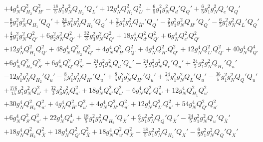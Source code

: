 {\begin{align}
 &+4 g_{N}^{4} Q_{H_2}^{2} Q_{H'}^{2} -\frac{18}{5} g_{1}^{2} g_{N}^{2} Q_{H_2}' Q_L' +12 g_{N}^{4} Q_{H_2}^{2} Q_{L'}^{2} +\frac{6}{5} g_{1}^{2} g_{N}^{2} Q_d' Q_Q' +\frac{6}{5} g_{1}^{2} g_{N}^{2} Q_e' Q_Q' \nonumber \\ 
 &-\frac{6}{5} g_{1}^{2} g_{N}^{2} Q_{H_1}' Q_Q' +\frac{24}{5} g_{1}^{2} g_{N}^{2} Q_{H_2}' Q_Q' +\frac{2}{5} g_{1}^{2} g_{N}^{2} Q_{\bar{H}'}' Q_Q' -\frac{2}{5} g_{1}^{2} g_{N}^{2} Q_{H'}' Q_Q' -\frac{6}{5} g_{1}^{2} g_{N}^{2} Q_L' Q_Q' \nonumber \\ 
 &+\frac{4}{3} g_{1}^{2} g_{N}^{2} Q_{Q'}^{2} +6 g_{2}^{2} g_{N}^{2} Q_{Q'}^{2} +\frac{32}{3} g_{3}^{2} g_{N}^{2} Q_{Q'}^{2} +18 g_{N}^{4} Q_{d'}^{2} Q_{Q'}^{2} +6 g_{N}^{4} Q_{e'}^{2} Q_{Q'}^{2} \nonumber \\ 
 &+12 g_{N}^{4} Q_{H_1}^{2} Q_{Q'}^{2} +48 g_{N}^{4} Q_{H_2}^{2} Q_{Q'}^{2} +4 g_{N}^{4} Q_{\bar{H}'}^{2} Q_{Q'}^{2} +4 g_{N}^{4} Q_{H'}^{2} Q_{Q'}^{2} +12 g_{N}^{4} Q_{L'}^{2} Q_{Q'}^{2} +40 g_{N}^{4} Q_{Q'}^{4} \nonumber \\ 
 &+6 g_{N}^{4} Q_{H_2}^{2} Q_{S'}^{2} +6 g_{N}^{4} Q_{Q'}^{2} Q_{S'}^{2} -\frac{24}{5} g_{1}^{2} g_{N}^{2} Q_d' Q_u' -\frac{24}{5} g_{1}^{2} g_{N}^{2} Q_e' Q_u' +\frac{24}{5} g_{1}^{2} g_{N}^{2} Q_{H_1}' Q_u' \nonumber \\ 
 &-12 g_{1}^{2} g_{N}^{2} Q_{H_2}' Q_u' -\frac{8}{5} g_{1}^{2} g_{N}^{2} Q_{\bar{H}'}' Q_u' +\frac{8}{5} g_{1}^{2} g_{N}^{2} Q_{H'}' Q_u' +\frac{24}{5} g_{1}^{2} g_{N}^{2} Q_L' Q_u' -\frac{36}{5} g_{1}^{2} g_{N}^{2} Q_Q' Q_u' \nonumber \\ 
 &+\frac{176}{15} g_{1}^{2} g_{N}^{2} Q_{u'}^{2} +\frac{32}{3} g_{3}^{2} g_{N}^{2} Q_{u'}^{2} +18 g_{N}^{4} Q_{d'}^{2} Q_{u'}^{2} +6 g_{N}^{4} Q_{e'}^{2} Q_{u'}^{2} +12 g_{N}^{4} Q_{H_1}^{2} Q_{u'}^{2} \nonumber \\ 
 &+30 g_{N}^{4} Q_{H_2}^{2} Q_{u'}^{2} +4 g_{N}^{4} Q_{\bar{H}'}^{2} Q_{u'}^{2} +4 g_{N}^{4} Q_{H'}^{2} Q_{u'}^{2} +12 g_{N}^{4} Q_{L'}^{2} Q_{u'}^{2} +54 g_{N}^{4} Q_{Q'}^{2} Q_{u'}^{2} \nonumber \\ 
 &+6 g_{N}^{4} Q_{S'}^{2} Q_{u'}^{2} +22 g_{N}^{4} Q_{u'}^{4} +\frac{18}{5} g_{1}^{2} g_{N}^{2} Q_{H_2}' Q_{\bar{X}}' +\frac{6}{5} g_{1}^{2} g_{N}^{2} Q_Q' Q_{\bar{X}}' -\frac{24}{5} g_{1}^{2} g_{N}^{2} Q_u' Q_{\bar{X}}' \nonumber \\ 
 &+18 g_{N}^{4} Q_{H_2}^{2} Q_{\bar{X}}^{2} +18 g_{N}^{4} Q_{Q'}^{2} Q_{\bar{X}}^{2} +18 g_{N}^{4} Q_{u'}^{2} Q_{\bar{X}}^{2} -\frac{18}{5} g_{1}^{2} g_{N}^{2} Q_{H_2}' Q_X' -\frac{6}{5} g_{1}^{2} g_{N}^{2} Q_Q' Q_X' \nonumber \\ 

\end{align}}
